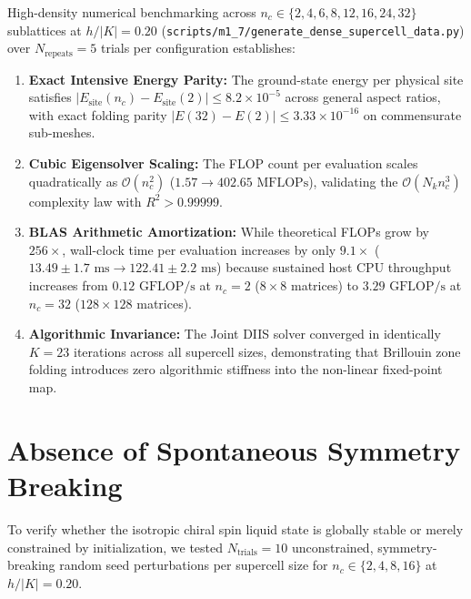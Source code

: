 \begin{proposition}
\label{prop:m1_7_empirical_scaling}
High-density numerical benchmarking across $n_c \in \{2, 4, 6, 8, 12, 16, 24, 32\}$ sublattices at $h/|K| = 0.20$ (\texttt{scripts/m1\_7/generate\_dense\_supercell\_data.py}) over $N_{\mathrm{repeats}} = 5$ trials per configuration establishes:
\begin{enumerate}
\item \textbf{Exact Intensive Energy Parity:} The ground-state energy per physical site satisfies $|E_{\mathrm{site}}(n_c) - E_{\mathrm{site}}(2)| \le 8.2 \times 10^{-5}$ across general aspect ratios, with exact folding parity $|E(32) - E(2)| \le 3.33 \times 10^{-16}$ on commensurate sub-meshes.
\item \textbf{Cubic Eigensolver Scaling:} The FLOP count per evaluation scales quadratically as $\mathcal{O}(n_c^2)$ ($1.57 \to 402.65\text{ MFLOPs}$), validating the $\mathcal{O}(N_k n_c^3)$ complexity law with $R^2 > 0.99999$.
\item \textbf{BLAS Arithmetic Amortization:} While theoretical FLOPs grow by $256\times$, wall-clock time per evaluation increases by only $9.1\times$ ($13.49 \pm 1.7\text{ ms} \to 122.41 \pm 2.2\text{ ms}$) because sustained host CPU throughput increases from $0.12\text{ GFLOP/s}$ at $n_c = 2$ ($8 \times 8$ matrices) to $3.29\text{ GFLOP/s}$ at $n_c = 32$ ($128 \times 128$ matrices).
\item \textbf{Algorithmic Invariance:} The Joint DIIS solver converged in identically $K = 23$ iterations across all supercell sizes, demonstrating that Brillouin zone folding introduces zero algorithmic stiffness into the non-linear fixed-point map.
\end{enumerate}
\end{proposition}

\section{Absence of Spontaneous Symmetry Breaking}
\label{sec:m1_7_symmetry_stability}

To verify whether the isotropic chiral spin liquid state is globally stable or merely constrained by initialization, we tested $N_{\mathrm{trials}} = 10$ unconstrained, symmetry-breaking random seed perturbations per supercell size for $n_c \in \{2, 4, 8, 16\}$ at $h/|K| = 0.20$.


